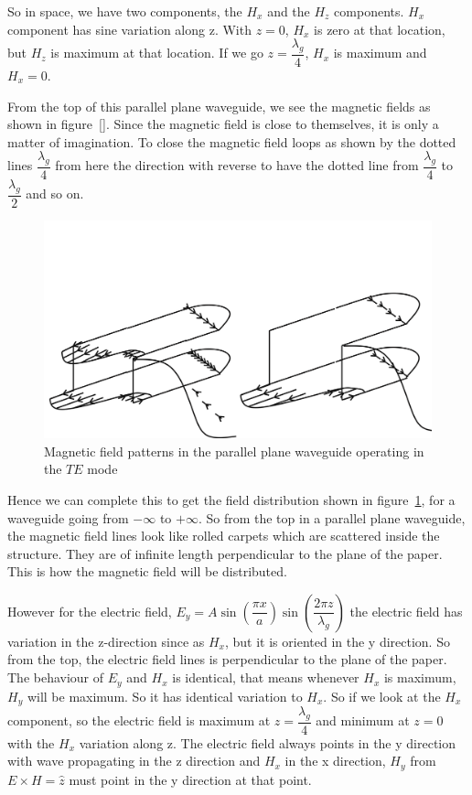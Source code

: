 So in space, we have two components, the ${H_x}$ and the ${H_z}$ components. ${H_x}$ component has sine variation along z. With $z=0$, ${H_x}$ is zero at that location, but ${H_z}$ is maximum at that location. If we go ${z=\dfrac{\lambda_g}{4}}$, ${H_x}$ is maximum and ${H_x=0}$.

From the top of this parallel plane waveguide, we see the magnetic fields as shown in figure~\ref{}. Since the magnetic field is close to themselves, it is only a matter of imagination. To close the magnetic field loops as shown by the dotted lines ${\dfrac{\lambda_g}{4}}$ from here the direction with reverse to have the dotted line from $\dfrac{\lambda_g}{4}$  to $\dfrac{\lambda_g}{2}$ and so on.
\begin{figure}[h]
\centering
\includegraphics[width=1\linewidth]{./graphics/WATSON}
\caption{Magnetic field patterns in the parallel plane waveguide operating in the $TE$ mode}
\label{fig:watson}
\end{figure}

Hence we can complete this to get the field distribution shown in figure~\ref{fig:watson}, for a waveguide going from ${-\infty}$ to ${+\infty}$. So from the top in a parallel plane waveguide, the magnetic field lines look like rolled carpets which are scattered inside the structure. They are of infinite length perpendicular to the plane of the paper. This is how the magnetic field will be distributed.

However for the electric field, ${E_y= A\sin(\dfrac{\pi x}{a})\sin(\dfrac{2\pi z}{\lambda_g})}$ the electric field has variation in the z-direction since as ${H_x}$, but it is oriented in the y direction. So from the top, the electric field lines is perpendicular to the plane of the paper. The behaviour of ${E_y}$ and ${H_x}$ is identical, that means whenever ${H_x}$ is maximum, ${H_y}$ will be maximum. So it has identical variation to ${H_x}$. So if we look at the ${H_x}$ component, so the electric field is maximum at ${z= \dfrac{\lambda_g}{4}}$ and minimum at $z=0$ with the ${H_x}$ variation along z. The electric field always points in the y direction with wave propagating in the z direction and ${H_x}$ in the x direction, ${H_y}$ from ${E\times H= \hat{z}}$ must point in the y direction at that point.


